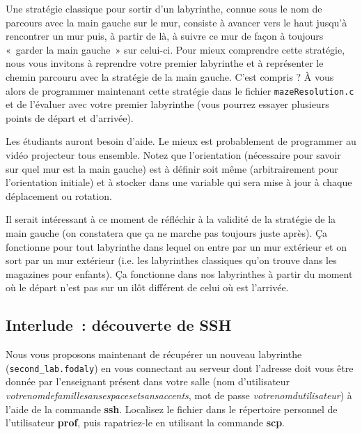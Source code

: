 \documentclass[a4paper]{article}
\newenvironment{enseignants}[1]{\noindent\color{blue}{\bf #1}}{}
\begin{document}
Une stratégie classique pour sortir d’un labyrinthe, connue sous le nom de parcours avec la main gauche sur le mur, consiste à avancer vers le haut jusqu'à rencontrer un mur puis, à partir de là, à suivre ce mur de façon à toujours «~garder la main gauche~» sur celui-ci. %
Pour mieux comprendre cette stratégie, nous vous invitons à reprendre votre premier labyrinthe et à représenter le chemin parcouru avec la stratégie de la main gauche. C’est compris ? \`A vous alors de programmer maintenant cette stratégie dans le fichier \texttt{mazeResolution.c} et de l’évaluer avec votre premier labyrinthe (vous pourrez essayer plusieurs points de départ et d'arrivée).

\begin{enseignants}{De l'aide~:}
Les étudiants auront besoin d'aide. Le mieux est probablement de programmer au vidéo projecteur tous ensemble. Notez que l'orientation (nécessaire pour savoir sur quel mur est la main gauche) est à définir soit même (arbitrairement pour l'orientation initiale) et à stocker dans une variable qui sera mise à jour à chaque déplacement ou rotation.
\end{enseignants}

\begin{enseignants}{Réflexion à avoir avec les étudiants une fois l'implantation de la stratégie de la main gauche terminée~:}
Il serait intéressant à ce moment de réfléchir à la validité de la stratégie de la main gauche (on constatera que ça ne marche pas toujours juste après). Ça fonctionne pour tout labyrinthe dans lequel on entre par un mur extérieur et on sort par un mur extérieur (i.e. les labyrinthes classiques qu'on trouve dans les magazines pour enfants). Ça fonctionne dans nos labyrinthes à partir du moment où le départ n'est pas sur un ilôt différent de celui où est l'arrivée.
\end{enseignants}

\subsection{Interlude~: découverte de SSH}

Nous vous proposons maintenant de récupérer un nouveau labyrinthe (\verb|second_lab.fodaly|) en vous connectant au serveur dont l'adresse doit vous être donnée par l'enseignant présent dans votre salle (nom d'utilisateur \textit{votrenomdefamillesansespacesetsansaccents}, mot de passe \textit{votrenomdutilisateur}) à l'aide de la commande \textbf{ssh}.
Localisez le fichier dans le répertoire personnel de l'utilisateur \textbf{prof}, puis rapatriez-le en utilisant la commande \textbf{scp}.
\end{document}

